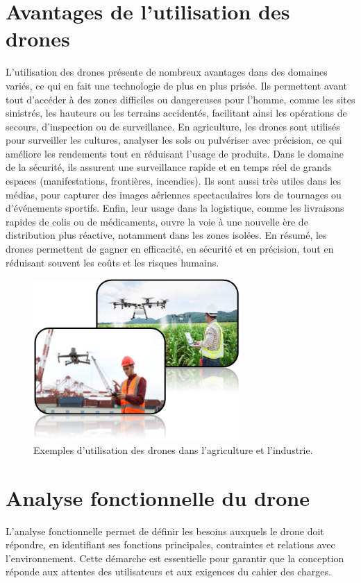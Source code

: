 \documentclass[a4paper,12pt]{report}
\begin{document}
\section{Avantages de l'utilisation des drones}
L'utilisation des drones présente de nombreux avantages dans des domaines variés, ce qui en fait une technologie de plus en plus prisée. Ils permettent avant tout d'accéder à des zones difficiles ou dangereuses pour l'homme, comme les sites sinistrés, les hauteurs ou les terrains accidentés, facilitant ainsi les opérations de secours, d'inspection ou de surveillance. En agriculture, les drones sont utilisés pour surveiller les cultures, analyser les sols ou pulvériser avec précision, ce qui améliore les rendements tout en réduisant l'usage de produits. Dans le domaine de la sécurité, ils assurent une surveillance rapide et en temps réel de grands espaces (manifestations, frontières, incendies). Ils sont aussi très utiles dans les médias, pour capturer des images aériennes spectaculaires lors de tournages ou d'événements sportifs. Enfin, leur usage dans la logistique, comme les livraisons rapides de colis ou de médicaments, ouvre la voie à une nouvelle ère de distribution plus réactive, notamment dans les zones isolées. En résumé, les drones permettent de gagner en efficacité, en sécurité et en précision, tout en réduisant souvent les coûts et les risques humains.

\begin{figure}[H]
    \centering
    \includegraphics[width=0.7\textwidth]{images/avantages_drones.png}
    \caption{Exemples d'utilisation des drones dans l'agriculture et l'industrie.}
    \label{fig:avantages_drones}
\end{figure}

\section{Analyse fonctionnelle du drone}
L'analyse fonctionnelle permet de définir les besoins auxquels le drone doit répondre, en identifiant ses fonctions principales, contraintes et relations avec l'environnement. Cette démarche est essentielle pour garantir que la conception réponde aux attentes des utilisateurs et aux exigences du cahier des charges.
\end{document}
